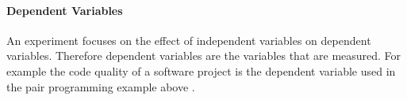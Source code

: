 
\paragraph{Dependent Variables}

An experiment focuses on the effect of independent variables on dependent variables. Therefore dependent variables are the variables that are measured. For example the code quality of a software project is the dependent variable used in the pair programming example above . 

